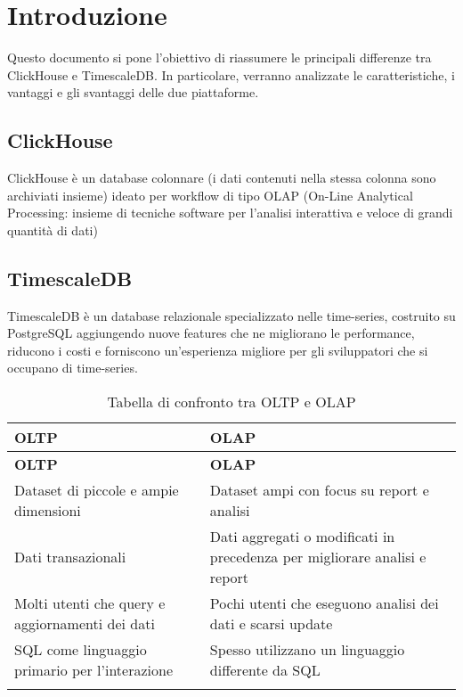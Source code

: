 \section{Introduzione}
Questo documento si pone l'obiettivo di riassumere le principali differenze tra  ClickHouse e TimescaleDB.
In particolare, verranno analizzate le caratteristiche, i vantaggi e gli svantaggi delle due piattaforme.\\

\subsection{ClickHouse}
ClickHouse è un database colonnare (i dati contenuti nella stessa colonna sono archiviati insieme) ideato per workflow di tipo OLAP (On-Line Analytical Processing: insieme di tecniche software per l'analisi interattiva e veloce di grandi quantità di dati)

\subsection{TimescaleDB}
TimescaleDB è un database relazionale specializzato nelle time-series, costruito su PostgreSQL aggiungendo nuove features che ne migliorano le performance, riducono i costi e forniscono un’esperienza migliore per gli sviluppatori che si occupano di time-series.

\begin{longtable}{|>{\raggedright\arraybackslash}m{}|>{\raggedright\arraybackslash}m{}|}
	\hline
	\textbf{OLTP} & \textbf{OLAP}\\
	\hline
	\endfirsthead
	\hline
	\textbf{OLTP} & \textbf{OLAP}\\
	\endhead
	 Dataset di piccole e ampie dimensioni  & Dataset ampi con focus su report e analisi\\
	\hline
	 Dati transazionali  & Dati aggregati o modificati in precedenza per migliorare analisi e report \\
	\hline
	 Molti utenti che query e aggiornamenti dei dati & Pochi utenti che eseguono analisi dei dati e scarsi update    \\
	\hline
     SQL come linguaggio primario per l'interazione & Spesso utilizzano un linguaggio differente da SQL    \\
	\hline
	\caption{Tabella di confronto tra OLTP e OLAP}
	\label{table:1}
\end{longtable}